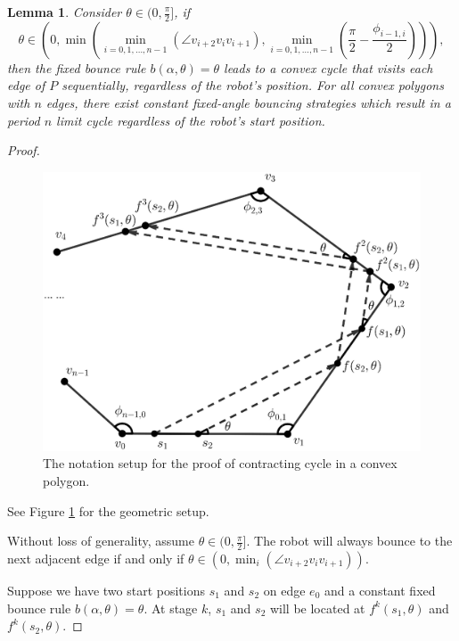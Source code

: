 \documentclass[sageh,times,Review]{sagej}
\newtheorem{lemma}{Lemma}
\begin{document}
\begin{lemma} \label{lem:convex}
Consider $\theta \in (0,\frac{\pi}{2}]$, if 
\begin{equation*}
\theta \in (0, \min(\min_{i = 0, 1, \dots, n-1}(\angle v_{i+2}v_{i}v_{i+1}),
\min_{i = 0, 1, \dots, n-1}(\frac{\pi}{2}-\frac{\phi_{i-1, i}}{2}))),
\end{equation*}
then the fixed bounce rule $b(\alpha, \theta) = \theta$ leads to a convex cycle that visits each edge of $P$ sequentially, regardless of the robot's position.
For all convex polygons with $n$ edges, there exist constant fixed-angle bouncing
strategies which result in a period $n$ limit cycle regardless of the robot's start position.
\end{lemma}
\begin{proof}
\begin{figure}
    \includegraphics[width=0.9\columnwidth]{convex_cycle.eps}
    \centering
    \caption{The notation setup for the proof of contracting cycle in a convex polygon.\label{fig:conv_cycle}}
    \centering
\end{figure}

See Figure \ref{fig:conv_cycle} for the geometric setup.

Without loss of generality, assume $\theta \in (0, \frac{\pi}{2}]$. The robot will always bounce
to the next adjacent edge if and only if
$\theta \in (0, \min_{i}(\angle v_{i+2}v_{i}v_{i+1}))$.

Suppose we have two start positions $s_1$ and $s_2$ on edge $e_0$ and a constant fixed bounce 
rule $b(\alpha, \theta) = \theta$.
At stage $k$, $s_1$ and $s_2$ will be located at $f^{k}(s_1,\theta)$ and
$f^{k}(s_2,\theta)$. 


\end{proof}
\end{document}

